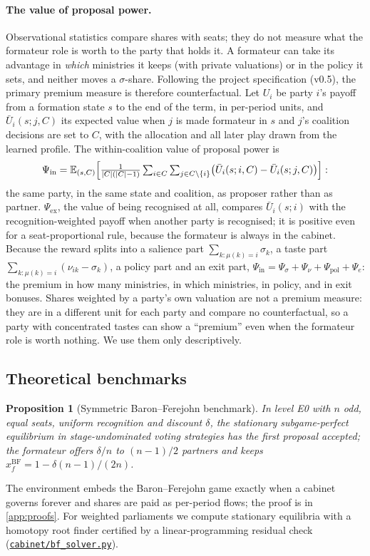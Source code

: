 \documentclass[11pt,a4paper]{article}
\newtheorem{proposition}{Proposition}
\newcommand{\repo}{https://github.com/bot2048/cabinet-bargaining-marl}
\newcommand{\code}[1]{\href{\repo/blob/main/#1}{\texttt{\small #1}}}
\newcommand{\E}{\mathbb{E}}
\newcommand{\BF}{\mathrm{BF}}
\begin{document}
\paragraph{The value of proposal power.} Observational statistics compare shares with seats; they do not
measure what the formateur role is worth to the party that holds it. A formateur can take its advantage in
\emph{which} ministries it keeps (with private valuations) or in the policy it sets, and neither moves a
$\sigma$-share. Following the project specification (v0.5), the primary premium measure is therefore
counterfactual. Let $U_i$ be party $i$'s payoff from a formation state $s$ to the end of the term, in
per-period units, and $\bar U_i(s;j,C)$ its expected value when $j$ is made formateur in $s$ and $j$'s
coalition decisions are set to $C$, with the allocation and all later play drawn from the learned profile.
The within-coalition value of proposal power is
\begin{equation}\label{eq:psi}
\Psi_{\mathrm{in}}=\E_{(s,C)}\Bigl[\tfrac{1}{|C|(|C|-1)}\textstyle\sum_{i\in C}\sum_{j\in C\setminus\{i\}}
\bigl(\bar U_i(s;i,C)-\bar U_i(s;j,C)\bigr)\Bigr]:
\end{equation}
the same party, in the same state and coalition, as proposer rather than as partner. $\Psi_{\mathrm{ex}}$,
the value of being recognised at all, compares $\bar U_i(s;i)$ with the recognition-weighted payoff when
another party is recognised; it is positive even for a seat-proportional rule, because the formateur is
always in the cabinet. Because the reward splits into a salience part $\sum_{k:\mu(k)=i}\sigma_k$, a taste
part $\sum_{k:\mu(k)=i}(\nu_{ik}-\sigma_k)$, a policy part and an exit part, $\Psi_{\mathrm{in}}=
\Psi_\sigma+\Psi_\nu+\Psi_{\mathrm{pol}}+\Psi_e$: the premium in how many ministries, in which ministries,
in policy, and in exit bonuses. Shares weighted by a party's own valuation are not a premium measure: they
are in a different unit for each party and compare no counterfactual, so a party with concentrated tastes
can show a ``premium'' even when the formateur role is worth nothing. We use them only descriptively.

\subsection{Theoretical benchmarks}\label{sec:theory}
\begin{proposition}[Symmetric Baron--Ferejohn benchmark]\label{prop:bf}
In level E0 with $n$ odd, equal seats, uniform recognition and discount $\delta$, the stationary
subgame-perfect equilibrium in stage-undominated voting strategies has the first proposal accepted; the
formateur offers $\delta/n$ to $(n-1)/2$ partners and keeps $x^{\BF}_f=1-\delta(n-1)/(2n)$.
\end{proposition}
\noindent The environment embeds the Baron--Ferejohn game exactly when a cabinet governs forever and
shares are paid as per-period flows; the proof is in \cref{app:proofs}. For weighted parliaments we
compute stationary equilibria with a homotopy root finder certified by a linear-programming residual
check (\code{cabinet/bf\_solver.py}).
\end{document}
